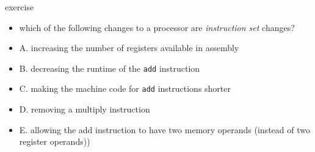 \begin{frame}{exercise}
    \begin{itemize}
    \item which of the following changes to a processor are \textit{instruction set} changes?
    \vspace{.5cm}
    \item A. increasing the number of registers available in assembly
    \item B. decreasing the runtime of the \texttt{add} instruction
    \item C. making the machine code for \texttt{add} instructions shorter
    \item D. removing a multiply instruction
    \item E. allowing the add instruction to have two memory operands (instead of two register operands))
    \end{itemize}
\end{frame}
